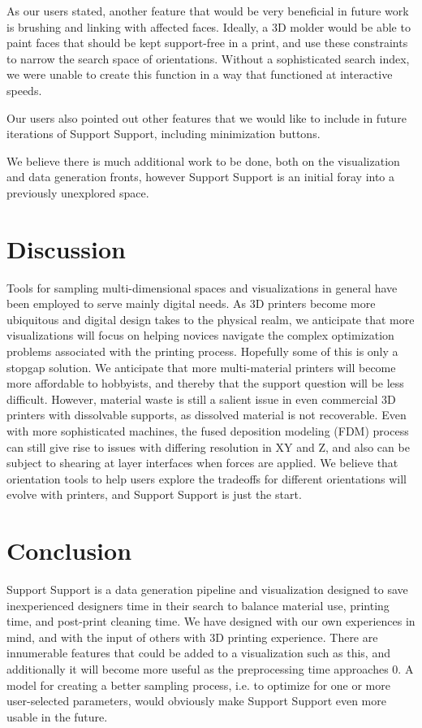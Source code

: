 \documentclass{sigchi}
\begin{document}
As our users stated, another feature that would be very beneficial in future work is brushing and linking with affected faces.  Ideally, a 3D molder would be able to paint faces that should be kept support-free in a print, and use these constraints to narrow the search space of orientations.  Without a sophisticated search index, we were unable to create this function in a way that functioned at interactive speeds.

Our users also pointed out other features that we would like to include in future iterations of Support Support, including minimization buttons.

We believe there is much additional work to be done, both on the visualization and data generation fronts, however Support Support is an initial foray into a previously unexplored space.

\section{Discussion}
Tools for sampling multi-dimensional spaces and visualizations in general have been employed to serve mainly digital needs.  As 3D printers become more ubiquitous and digital design takes to the physical realm, we anticipate that more visualizations will focus on helping novices navigate the complex optimization problems associated with the printing process.  Hopefully some of this is only a stopgap solution.  We anticipate that more multi-material printers will become more affordable to hobbyists, and thereby that the support question will be less difficult.  However, material waste is still a salient issue in even commercial 3D printers with dissolvable supports, as dissolved material is not recoverable.  Even with more sophisticated machines, the fused deposition modeling (FDM) process can still give rise to issues with differing resolution in XY and Z, and also can be subject to shearing at layer interfaces when forces are applied.  We believe that orientation tools to help users explore the tradeoffs for different orientations will evolve with printers, and Support Support is just the start.

\section{Conclusion}
Support Support is a data generation pipeline and visualization designed to save inexperienced designers time in their search to balance material use, printing time, and post-print cleaning time.  We have designed with our own experiences in mind, and with the input of others with 3D printing experience.  There are innumerable features that could be added to a visualization such as this, and additionally it will become more useful as the preprocessing time approaches 0.  A model for creating a better sampling process, i.e. to optimize for one or more user-selected parameters, would obviously make Support Support even more usable in the future.
\end{document}
